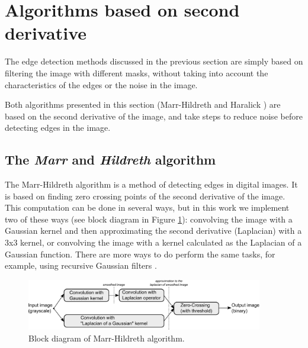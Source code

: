\documentclass{ipol}
\numberwithin{equation}{section}
\numberwithin{table}{section}
\begin{document}

\section{Algorithms based on second derivative}
\label{sec:second}

The edge detection methods discussed in the previous section are simply based on filtering the 
image with different masks, without taking into account the characteristics of the edges or 
the noise in the image. 

Both algorithms presented in this section (Marr-Hildreth \cite{segm:edge_region:marr:84:digital_step} and Haralick \cite{bb20239}) 
are based on the second derivative of the image, and take steps to reduce noise before 
detecting edges in the image.


\subsection{The \textit{Marr} and \textit{Hildreth} algorithm}

The Marr-Hildreth algorithm is a method of detecting edges in digital 
images. It is based on finding zero crossing points of the second derivative
of the image. This computation can be done in several ways, but in this work we implement two of these ways  (see block diagram in Figure \ref{fig:blockdiagram2}): convolving the image with a Gaussian kernel and then 
approximating the second derivative (Laplacian) with a 3x3 kernel, or 
convolving the image with a kernel calculated as the Laplacian of a 
Gaussian function. There are more ways to do perform the same tasks, for example, using 
recursive Gaussian filters \cite{Deriche1993Recursively}. 

\begin{figure}[!b]
	\centering
	\includegraphics[width=0.92\textwidth]{blockdiagram2.pdf}
	\caption{Block diagram of Marr-Hildreth algorithm.}
	\label{fig:blockdiagram2}
\end{figure}
\end{document}
